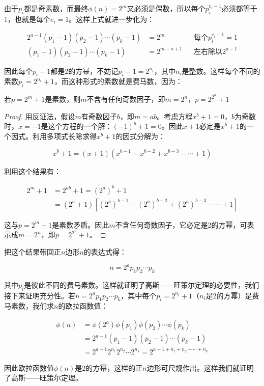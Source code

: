 由于$p_i$都是奇素数，而最终$\phi(n) = 2^m$又必须是偶数，所以每个$p_i^{e_i - 1}$必须都等于1，也就是每个$e_i = 1$。这样上式就进一步化为：

\begin{align*}
2^{a-1} (p_1 - 1)(p_2 - 1) \dotsm (p_k - 1) & = 2^m  && \text{每个}p_i^{e_i - 1} = 1 \\
(p_1 - 1)(p_2 - 1) \dotsm (p_k - 1) &= 2^{m - a + 1} && \text{左右除以}2^{a-1}
\end{align*}

因此每个$p_i - 1$都是2的方幂，不妨记$p_i - 1 = 2^{n_i}$，其中$n_i$是整数。这样每个不同的素数$p_i = 2^{n_i} + 1$，而这种形式的素数就是费马数，因为：

\begin{proposition}
若$p = 2^m + 1$是素数，则$m$不含有任何奇数因子，即$m = 2^n$，$p = 2^{2^n} + 1$
\end{proposition}

\begin{proof}
用反证法，假设$m$有奇数因子$b$，即$m = ab$。考虑方程$x^b + 1 = 0$，$b$为奇数时，$x = -1$是这个方程的一个解：$(-1)^b + 1 = 0$。因此$x + 1$必定是$x^b + 1$的一个因式。利用多项式长除求得$x^b + 1$的因式分解为：

\[
x^b + 1 = (x + 1)(x^{b-1} - x^{b-2} + x^{b-3} - \dotsb + 1)
\]

利用这个结果有：

\begin{align*}
2^m + 1 &= 2^{ab} + 1 = (2^a)^b + 1 \\
  &= (2^a + 1)[(2^a)^{b-1} - (2^a)^{b-2} + (2^a)^{b-3} - \dotsb + 1]
\end{align*}

这与$p = 2^m + 1$是素数矛盾。因此$m$不含任何奇数因子，它必定是2的方幂，可表示成$m = 2^n$，即$p = 2^{2^n} + 1$。
\end{proof}

把这个结果带回正$n$边形$n$的表达式得：

\[
n = 2^a p_1 p_2 \dotsm p_k
\]

其中$p_i$是彼此不同的费马素数。这样就证明了高斯——旺策尔定理的必要性，我们接下来证明充分性。若$n = 2^a p_1 p_2 \dotsm p_k$，其中每个$p_i = 2^{n_i} + 1$（$n_i$是2的方幂）是费马素数，我们求$n$的欧拉函数值：

\begin{align*}
\phi(n) &= \phi(2^a) \phi(p_1) \phi(p_2) \dotsm \phi(p_k)  \\
   &= 2^{a - 1} (p_1 - 1) (p_2 - 1) \dotsm (p_k - 1) \\
   &= 2^{a-1} 2^{n_1} 2^{n_2} \dotsm 2^{n_k} = 2^{a - 1 + n_1 + n_2 + \dotsb + n_k}
\end{align*}

因此欧拉函数值$\phi(n)$是2的方幂，这样的正$n$边形可尺规作出。这样我们就证明了高斯——旺策尔定理。

